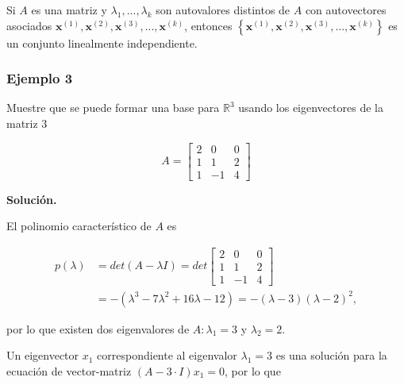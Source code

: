 \documentclass[12pt, a4paper]{article}
\numberwithin{subsection}{section} %
\begin{document}
        Si $A$ es una matriz y $\lambda_{1}, ..., \lambda_{k}$ son autovalores distintos de $A$ con autovectores asociados $\textbf{x}^{\left( 1 \right)}, \textbf{x}^{\left( 2 \right)}, \textbf{x}^{\left( 3 \right)}, ..., \textbf{x}^{\left( k \right)}$, entonces $\left\{ \textbf{x}^{\left( 1 \right)}, \textbf{x}^{\left( 2 \right)}, \textbf{x}^{\left( 3 \right)}, ..., \textbf{x}^{\left( k \right)} \right\}$ es un conjunto linealmente independiente.
        
        \subsubsection*{Ejemplo 3}
        
            Muestre que se puede formar una base para $\mathbb{R}^3$ usando los eigenvectores de la matriz 3 
        
            \begin{equation*}
                A =\begin{bmatrix}
                2 & 0 & 0 \\
                1 & 1 & 2 \\
                1 & -1 & 4
                \end{bmatrix}
            \end{equation*}
        
            {\bf Solución.}
        
            El polinomio característico de $A$ es
        
            \begin{align*}
                p(\lambda) &= det(A - \lambda I) = det\begin{bmatrix}
                                                        2 & 0 & 0 \\
                                                        1 & 1 & 2 \\
                                                        1 & -1 & 4
                                                        \end{bmatrix} \\
                &= -(\lambda^3 - 7\lambda^2 + 16\lambda  - 12) = -(\lambda  - 3)(\lambda  - 2)^2,
            \end{align*}
        
            por lo que existen dos eigenvalores de $A: \lambda_1 = 3$ y $\lambda_2 = 2$.
        
            Un eigenvector $x_1$ correspondiente al eigenvalor $\lambda_1 = 3$ es una solución para la ecuación de vector-matriz $(A - 3 · I )x_1 = 0$, por lo que \\
        
\end{document}
